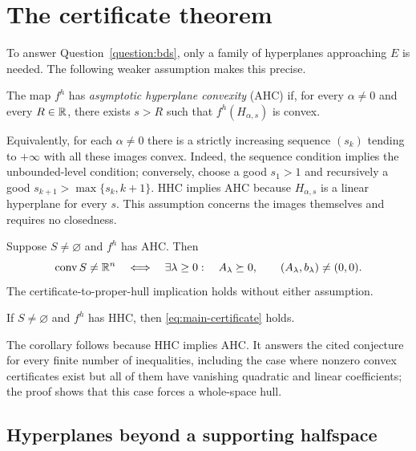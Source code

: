 \section{The certificate theorem}
\label{sec:certificate}

To answer Question~\ref{question:bds}, only a family of hyperplanes
approaching $E$ is needed. The following weaker assumption makes this
precise.

\begin{definition}\label{def:ahc}
The map $f^h$ has \emph{asymptotic hyperplane convexity} (AHC) if, for
every $\alpha\ne0$ and every $R\in\mathbb R$, there exists $s>R$ such that
$f^h(H_{\alpha,s})$ is convex.
\end{definition}

Equivalently, for each $\alpha\ne0$ there is a strictly increasing
sequence $(s_k)$ tending to $+\infty$ with all these images convex.
Indeed, the sequence condition implies the unbounded-level condition;
conversely, choose a good $s_1>1$ and recursively a good
$s_{k+1}>\max\{s_k,k+1\}$. HHC implies AHC because
$H_{\alpha,s}$ is a linear hyperplane for every $s$.
This assumption concerns the images themselves and requires no closedness.

\begin{theorem}\label{thm:certificate}
Suppose $S\ne\varnothing$ and $f^h$ has AHC. Then
\begin{equation}\label{eq:main-certificate}
 \operatorname{conv} S\ne\mathbb R^n
 \quad\Longleftrightarrow\quad
 \exists\lambda\geq0:\quad
 A_\lambda\succeq0,\qquad (A_\lambda,b_\lambda)\ne(0,0).
\end{equation}
The certificate-to-proper-hull implication holds without either assumption.
\end{theorem}

\begin{corollary}
\label{cor:hhc-certificate}
If $S\ne\varnothing$ and $f^h$ has HHC, then
\eqref{eq:main-certificate} holds.
\end{corollary}

The corollary follows because HHC implies AHC. It answers the cited
conjecture for every finite number of inequalities, including the case
where nonzero convex certificates exist but all of them have vanishing
quadratic and linear coefficients; the proof shows that this case forces
a whole-space hull.

\subsection{Hyperplanes beyond a supporting halfspace}

